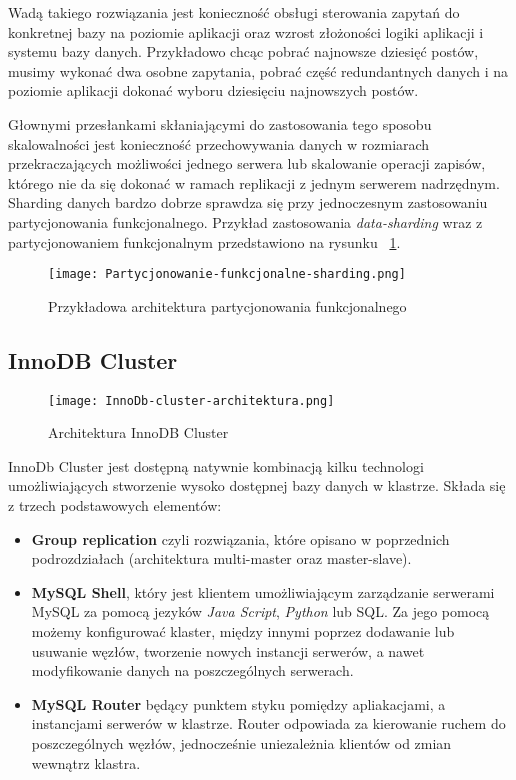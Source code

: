 Wadą takiego rozwiązania jest konieczność obsługi sterowania zapytań do konkretnej bazy na poziomie aplikacji oraz wzrost złożoności logiki aplikacji i systemu bazy danych. Przykładowo chcąc pobrać najnowsze dziesięć postów, musimy wykonać dwa osobne zapytania, pobrać część redundantnych danych i na poziomie aplikacji dokonać wyboru dziesięciu najnowszych postów.


Głownymi przesłankami skłaniającymi do zastosowania tego sposobu skalowalności jest konieczność przechowywania danych w rozmiarach przekraczających możliwości jednego serwera lub skalowanie operacji zapisów, którego nie da się dokonać w ramach replikacji z jednym serwerem nadrzędnym. Sharding danych bardzo dobrze sprawdza się przy jednoczesnym zastosowaniu partycjonowania funkcjonalnego. Przykład zastosowania \textit{data-sharding} wraz z partycjonowaniem funkcjonalnym przedstawiono na rysunku ~\ref{fig:data-sharding}.

\begin{figure}[!h]
	\centering
	\texttt{[image: Partycjonowanie-funkcjonalne-sharding.png]}
	\caption{Przykładowa architektura partycjonowania funkcjonalnego}
	\label{fig:data-sharding}
\end{figure}


\subsection{InnoDB Cluster}

\begin{figure}[!h]
	\centering
	\texttt{[image: InnoDb-cluster-architektura.png]}
	\caption{Architektura InnoDB Cluster}
	\label{fig:label}
\end{figure}
InnoDb Cluster jest dostępną natywnie kombinacją kilku technologi umożliwiających stworzenie wysoko dostępnej bazy danych w klastrze. Składa się z trzech podstawowych elementów:
\begin{itemize}
	\item \textbf{Group replication} czyli rozwiązania, które opisano w poprzednich podrozdziałach (architektura multi-master oraz master-slave).
	\item \textbf{MySQL Shell}, który jest klientem umożliwiającym zarządzanie serwerami MySQL za pomocą jezyków \textit{Java Script}, \textit{Python} lub SQL. Za jego pomocą możemy konfigurować klaster, między innymi poprzez dodawanie lub usuwanie węzłów, tworzenie nowych instancji serwerów, a nawet modyfikowanie danych na poszczególnych serwerach.
	\item \textbf{MySQL Router} będący punktem styku pomiędzy apliakacjami, a instancjami serwerów w klastrze. Router odpowiada za kierowanie ruchem do poszczególnych węzłów, jednocześnie uniezależnia klientów od zmian wewnątrz klastra. 
\end{itemize}

